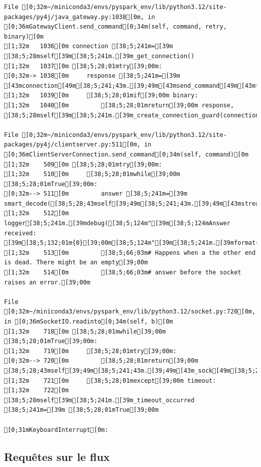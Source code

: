 \documentclass[
  letterpaper,
  DIV=11,
  numbers=noendperiod]{scrartcl}
\begin{document}
\begin{verbatim}
File [0;32m~/miniconda3/envs/pyspark_env/lib/python3.12/site-packages/py4j/java_gateway.py:1038[0m, in [0;36mGatewayClient.send_command[0;34m(self, command, retry, binary)[0m
[1;32m   1036[0m connection [38;5;241m=[39m [38;5;28mself[39m[38;5;241m.[39m_get_connection()
[1;32m   1037[0m [38;5;28;01mtry[39;00m:
[0;32m-> 1038[0m     response [38;5;241m=[39m [43mconnection[49m[38;5;241;43m.[39;49m[43msend_command[49m[43m([49m[43mcommand[49m[43m)[49m
[1;32m   1039[0m     [38;5;28;01mif[39;00m binary:
[1;32m   1040[0m         [38;5;28;01mreturn[39;00m response, [38;5;28mself[39m[38;5;241m.[39m_create_connection_guard(connection)

File [0;32m~/miniconda3/envs/pyspark_env/lib/python3.12/site-packages/py4j/clientserver.py:511[0m, in [0;36mClientServerConnection.send_command[0;34m(self, command)[0m
[1;32m    509[0m [38;5;28;01mtry[39;00m:
[1;32m    510[0m     [38;5;28;01mwhile[39;00m [38;5;28;01mTrue[39;00m:
[0;32m--> 511[0m         answer [38;5;241m=[39m smart_decode([38;5;28;43mself[39;49m[38;5;241;43m.[39;49m[43mstream[49m[38;5;241;43m.[39;49m[43mreadline[49m[43m([49m[43m)[49m[:[38;5;241m-[39m[38;5;241m1[39m])
[1;32m    512[0m         logger[38;5;241m.[39mdebug([38;5;124m"[39m[38;5;124mAnswer received: [39m[38;5;132;01m{0}[39;00m[38;5;124m"[39m[38;5;241m.[39mformat(answer))
[1;32m    513[0m         [38;5;66;03m# Happens when a the other end is dead. There might be an empty[39;00m
[1;32m    514[0m         [38;5;66;03m# answer before the socket raises an error.[39;00m

File [0;32m~/miniconda3/envs/pyspark_env/lib/python3.12/socket.py:720[0m, in [0;36mSocketIO.readinto[0;34m(self, b)[0m
[1;32m    718[0m [38;5;28;01mwhile[39;00m [38;5;28;01mTrue[39;00m:
[1;32m    719[0m     [38;5;28;01mtry[39;00m:
[0;32m--> 720[0m         [38;5;28;01mreturn[39;00m [38;5;28;43mself[39;49m[38;5;241;43m.[39;49m[43m_sock[49m[38;5;241;43m.[39;49m[43mrecv_into[49m[43m([49m[43mb[49m[43m)[49m
[1;32m    721[0m     [38;5;28;01mexcept[39;00m timeout:
[1;32m    722[0m         [38;5;28mself[39m[38;5;241m.[39m_timeout_occurred [38;5;241m=[39m [38;5;28;01mTrue[39;00m

[0;31mKeyboardInterrupt[0m: 
\end{verbatim}

\subsection{Requêtes sur le flux}\label{requuxeates-sur-le-flux}
\end{document}
